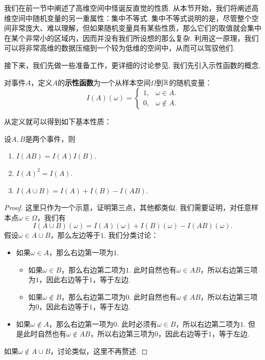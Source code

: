 我们在前一节中阐述了高维空间中怪诞反直觉的性质. 从本节开始，我们将阐述高维空间中随机变量的另一重属性：集中不等式. 集中不等式说明的是，尽管整个空间非常庞大、难以理解，但如果随机变量具有某些性质，那么它们的取值就会集中在某个非常小的区域内，因而并没有我们所设想的那么复杂. 利用这一原理，我们可以将非常高维的数据压缩到一个较为低维的空间中，从而可以驾驭他们. 

接下来，我们先做一些准备工作，更详细的讨论参见. 我们先引入示性函数的概念.
\begin{definition}[示性函数]\label{definition:indicator-function}
    对事件$A$，定义$A$的\textbf{示性函数}为一个从样本空间$\Omega$到$\mathbb{R}$的随机变量：
\begin{equation*}
    I(A)(\omega) = 
    \begin{cases}
        1,& \omega \in A. \\
        0,& \omega \notin A.
    \end{cases}
\end{equation*}
\end{definition}

从定义就可以得到如下基本性质：
\begin{proposition}\label{proposition:indicator-function}
    设$A, B$是两个事件，则
    \begin{enumerate}
        \item $I(AB) = I(A) I(B)$.
        \item $I(A)^2 = I(A)$.
        \item $I(A\cup B) = I(A) +I(B) - I(AB) $.
    \end{enumerate}
\end{proposition}
\begin{proof}
    这里只作为一个示意，证明第三点，其他都类似. 我们需要证明，对任意样本点$\omega\in\Omega$，我们有
    \[
        I(A\cup B)(\omega) = I(A)(\omega) + I(B)(\omega) - I(AB)(\omega).
    \]
    假设$\omega\in A\cup B$，那么左边等于$1$. 我们分类讨论：
    \begin{itemize}
        \item 如果$\omega\in A$，那么右边第一项为$1$.
        \begin{itemize}
            \item 如果$\omega\in B$，那么右边第二项为$1$. 此时自然也有$\omega\in AB$，所以右边第三项为$1$，因此右边等于$1$，等于左边. 
            \item 如果$\omega\notin B$，那么右边第二项为$0$. 此时自然也有$\omega\notin AB$，所以右边第三项为$0$，因此右边等于$1$，等于左边. 
        \end{itemize}
        \item 如果$\omega\notin A$，那么右边第一项为$0$. 此时必须有$\omega\in B$，所以右边第二项为$1$. 但是此时自然也有$\omega\notin AB$，所以右边第三项为$0$，因此右边等于$1$，等于左边. 
    \end{itemize}
    如果$\omega\notin A\cup B$，讨论类似，这里不再赘述. 
\end{proof}

